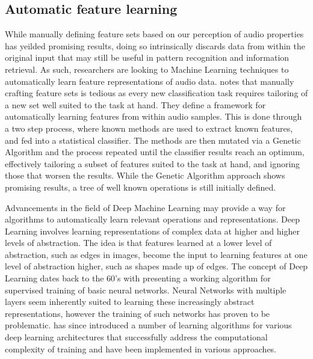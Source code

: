\documentclass[twoside]{article}
\begin{document}
\begin{multicols}{2}
\section{Automatic feature learning}
While manually defining feature sets based on our perception of audio properties has yeilded promising results, doing so intrinsically discards data from within the original input that may still be useful in pattern recognition and information retrieval. As such, researchers are looking to Machine Learning techniques to automatically learn feature representations of audio data.  \citet{mierswa2005automatic} notes that manually crafting feature sets is tedious as every new classification task requires tailoring of a new set well suited to the task at hand. They define a framework for automatically learning features from within audio samples. This is done through a two step process, where known methods are used to extract known features, and fed into a statistical classifier. The methods are then mutated via a Genetic Algorithm and the process repeated until the classifier results reach an optimum, effectively tailoring a subset of features suited to the task at hand, and ignoring those that worsen the results. While the Genetic Algorithm approach shows promising results, a tree of well known operations is still initially defined.

Advancements in the field of Deep Machine Learning may provide a way for algorithms to automatically learn relevant operations and representations. Deep Learning involves learning representations of complex data at higher and higher levels of abstraction. The idea is that features learned at a lower level of abstraction, such as edges in images, become the input to learning features at one level of abstraction higher, such as shapes made up of edges. The concept of Deep Learning dates back to the 60's with \citet{ivakhnenko1965cybernetic} presenting a working algorithm for supervised training of basic neural networks. Neural Networks with multiple layers seem inherently suited to learning these increasingly abstract representations, however the training of such networks has proven to be problematic. \citet{bengio2009learning} has since introduced a number of learning algorithms for various deep learning architectures that successfully address the computational complexity of training and have been implemented in various approaches.


\end{multicols}
\end{document}
